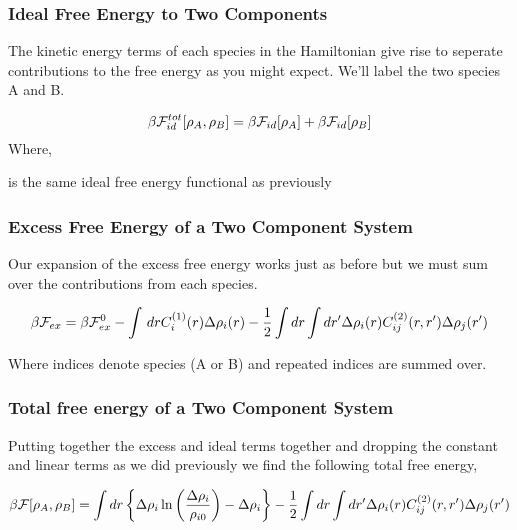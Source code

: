 \subsubsection{Ideal Free Energy to Two Components} The kinetic energy terms of
each species in the Hamiltonian give rise to seperate contributions to the free
energy as you might expect.  We'll label the two species A and B.

\begin{equation} \beta\mathcal{F}^{tot}_{id}[\rho_A, \rho_B] = \beta\mathcal{F}_{id}[\rho_A] +
\beta\mathcal{F}_{id}[\rho_B] \end{equation} Where,
\begin{description}[labelindent=10pt, labelsep=10pt] \item[$\beta\F_{id}$] is
            the same ideal free energy functional as previously
\end{description}

\subsubsection{Excess Free Energy of a Two Component System} Our expansion of
the excess free energy works just as before but we must sum over the
contributions from each species.

\begin{equation} \beta\mathcal{F}_{ex} = \beta\mathcal{F}_{ex}^0 - \int \,dr C^{(1)}_{i}(r)
\Delta\rho_i(r) - \frac{1}{2} \int dr \int dr^\prime \Delta\rho_i(r)
C^{(2)}_{ij}(r, r^\prime) \Delta\rho_j(r^\prime) \end{equation}

Where indices denote species (A or B) and repeated indices are summed over.

\subsubsection{Total free energy of a Two Component System}

Putting together the excess and ideal terms together and dropping the constant
and linear terms as we did previously we find the following total free energy,

\begin{equation} \beta\mathcal{F}[\rho_A, \rho_B] = \int dr \left\lbrace \Delta\rho_i
\ln\left(\frac{\Delta\rho_i}{\rho_{i0}}\right) - \Delta\rho_i\right\rbrace - \frac{1}{2} \int dr
\int dr^\prime \Delta\rho_i(r) C^{(2)}_{ij}(r, r^\prime) \Delta
\rho_j(r^\prime) \end{equation}

